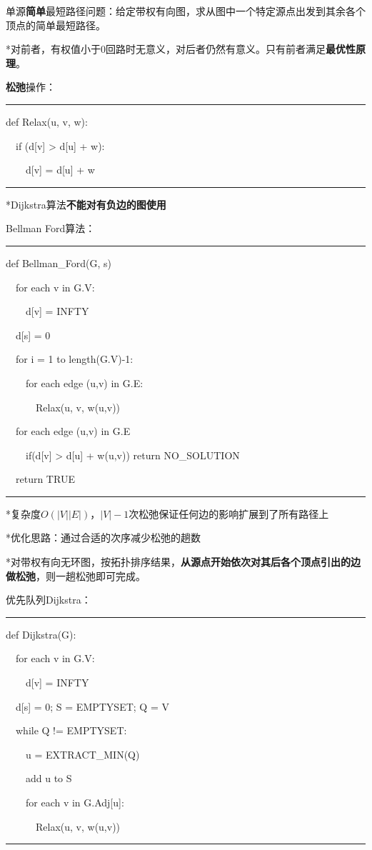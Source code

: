 \documentclass[a4paper,UTF8,fontset=windows]{ctexart}
\newenvironment{code}{\rule{36em}{0.1em}\setlength{\parindent}{1em}

}{

\setlength{\parindent}{0em}\rule{36em}{0.1em}}
\begin{document}
单源\textbf{简单}最短路径问题：给定带权有向图，求从图中一个特定源点出发到其余各个顶点的简单最短路径。

*\hspace{0em}对前者，有权值小于0回路时无意义，对后者仍然有意义。只有前者满足\textbf{最优性原理}。

\textbf{松弛}操作：

\begin{code}
def Relax(u, v, w):

\ \ if (d[v] > d[u] + w):

\ \ \ \ d[v] = d[u] + w
\end{code}

*\hspace{0em}Dijkstra算法\textbf{不能对有负边的图使用}

Bellman Ford算法：

\begin{code}
def Bellman\_Ford(G, s)

\ \ for each v in G.V:

\ \ \ \ d[v] = INFTY

\ \ d[s] = 0

\ \ for i = 1 to length(G.V)-1:

\ \ \ \ for each edge (u,v) in G.E:

\ \ \ \ \ \ Relax(u, v, w(u,v))

\ \ for each edge (u,v) in G.E

\ \ \ \ if(d[v] > d[u] + w(u,v)) return NO\_SOLUTION

\ \ return TRUE
\end{code}

*\hspace{0em}复杂度$O(|V||E|)$，$|V|-1$次松弛保证任何边的影响扩展到了所有路径上

*\hspace{0em}优化思路：通过合适的次序减少松弛的趟数

*\hspace{0em}对带权有向无环图，按拓扑排序结果，\textbf{从源点开始依次对其后各个顶点引出的边做松弛}，则一趟松弛即可完成。

优先队列Dijkstra：

\begin{code}
def Dijkstra(G):

\ \ for each v in G.V:

\ \ \ \ d[v] = INFTY

\ \ d[s] = 0; S = EMPTYSET; Q = V

\ \ while Q != EMPTYSET:

\ \ \ \ u = EXTRACT\_MIN(Q)

\ \ \ \ add u to S

\ \ \ \ for each v in G.Adj[u]:

\ \ \ \ \ \ Relax(u, v, w(u,v))
\end{code}
\end{document}
